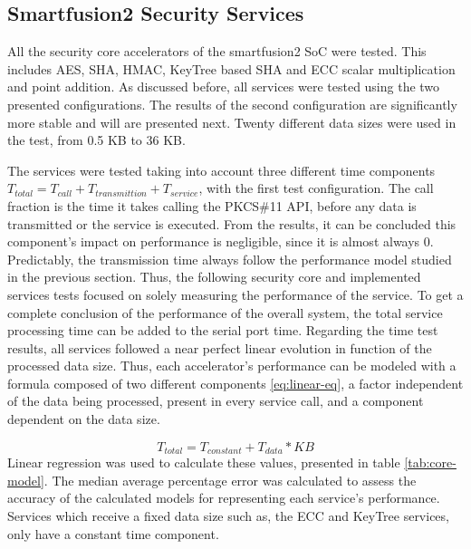 \subsection{Smartfusion2 Security Services}\label{chap:evaluation:board}

All the security core accelerators of the smartfusion2 SoC were tested. This includes \ac{AES}, \ac{SHA}, \ac{HMAC}, KeyTree based \ac{SHA} and \ac{ECC} scalar multiplication and point addition.
As discussed before, all services were tested using the two presented configurations. The results of the second configuration are significantly more stable and will are presented next.
Twenty different data sizes were used in the test, from 0.5 KB to 36 KB.

The services were tested taking into account three different time components \(T_{total} = T_{call} + T_{transmittion} + T_{service}\), with the first test configuration. The call fraction is the time it takes calling the PKCS\#11 API, before any data is transmitted or the service is executed. From the results, it can be concluded this component's impact on performance is negligible, since it is almost always 0.
Predictably, the transmission time always follow the performance model studied in the previous section.
Thus, the following security core and implemented services tests focused on solely measuring the performance of the service. To get a complete conclusion of the performance of the overall system, the total service processing time can be added to the serial port time.
Regarding the time test results, all services followed a near perfect linear evolution in function of the processed data size. Thus, each accelerator's performance can be modeled with a formula composed of two different components \ref{eq:linear-eq}, a factor independent of the data being processed, present in every service call, and a component dependent on the data size.

\begin{equation}
	\label{eq:linear-eq}
	T_{total} = T_{constant} + T_{data} * KB
\end{equation}
Linear regression was used to calculate these values, presented in table \ref{tab:core-model}. The median average percentage error was calculated to assess the accuracy of the calculated models for representing each service's performance. Services which receive a fixed data size such as, the \ac{ECC} and KeyTree services, only have a constant time component.

